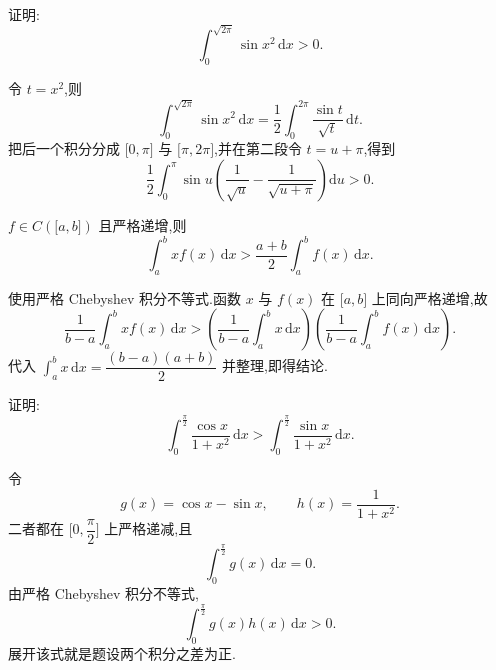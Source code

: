 
\begin{example}
    证明:
    \[
        \displaystyle\int_0^{\sqrt{2\pi}}\sin x^2\,\mathrm{d}x>0.
    \]
\end{example}
\exampleblank

\begin{solution}
    令 $t=x^2$,则
    \[
        \displaystyle\int_0^{\sqrt{2\pi}}\sin x^2\,\mathrm{d}x
        =\dfrac{1}{2}\int_0^{2\pi}\dfrac{\sin t}{\sqrt t}\,\mathrm{d}t.
    \]
    把后一个积分分成 $\lbrack0,\pi\rbrack$ 与 $\lbrack\pi,2\pi\rbrack$,并在第二段令 $t=u+\pi$,得到
    \[
        \dfrac{1}{2}\int_0^\pi
        \sin u\left(\dfrac{1}{\sqrt u}
        -\dfrac{1}{\sqrt{u+\pi}}\right)\mathrm{d}u>0.
    \]
\end{solution}

\begin{example}
    $f\in C(\lbrack a,b\rbrack)$ 且严格递增,则
    \[
        \displaystyle\int_a^bxf(x)\,\mathrm{d}x
        >\dfrac{a+b}{2}\int_a^bf(x)\,\mathrm{d}x.
    \]
\end{example}
\exampleblank

\begin{solution}
    使用严格 Chebyshev 积分不等式.函数 $x$ 与 $f(x)$ 在 $\lbrack a,b\rbrack$ 上同向严格递增,故
    \[
        \dfrac{1}{b-a}\int_a^bxf(x)\,\mathrm{d}x
        >
        \left(\dfrac{1}{b-a}\int_a^bx\,\mathrm{d}x\right)
        \left(\dfrac{1}{b-a}\int_a^bf(x)\,\mathrm{d}x\right).
    \]
    代入 $\displaystyle\int_a^b x\,\mathrm{d}x=\dfrac{(b-a)(a+b)}{2}$ 并整理,即得结论.
\end{solution}

\begin{example}
    证明:
    \[
        \displaystyle\int_0^{\frac{\pi}{2}}\dfrac{\cos x}{1+x^2}\,\mathrm{d}x
        >\int_0^{\frac{\pi}{2}}\dfrac{\sin x}{1+x^2}\,\mathrm{d}x.
    \]
\end{example}
\exampleblank

\begin{solution}
    令
    \[
        g(x)=\cos x-\sin x,
        \qquad
        h(x)=\dfrac{1}{1+x^2}.
    \]
    二者都在 $\lbrack0,\dfrac{\pi}{2}\rbrack$ 上严格递减,且
    \[
        \displaystyle\int_0^{\frac{\pi}{2}}g(x)\,\mathrm{d}x=0.
    \]
    由严格 Chebyshev 积分不等式,
    \[
        \displaystyle\int_0^{\frac{\pi}{2}}g(x)h(x)\,\mathrm{d}x>0.
    \]
    展开该式就是题设两个积分之差为正.
\end{solution}



